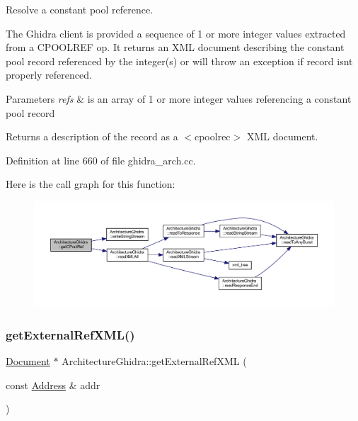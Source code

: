 Resolve a constant pool reference. 

The Ghidra client is provided a sequence of 1 or more integer values extracted from a C\+P\+O\+O\+L\+R\+EF op. It returns an X\+ML document describing the constant pool record referenced by the integer(s) or will throw an exception if record isn\textquotesingle{}t properly referenced. 
\begin{DoxyParams}{Parameters}
{\em refs} & is an array of 1 or more integer values referencing a constant pool record \\
\hline
\end{DoxyParams}
\begin{DoxyReturn}{Returns}
a description of the record as a $<$cpoolrec$>$ X\+ML document. 
\end{DoxyReturn}


Definition at line 660 of file ghidra\+\_\+arch.\+cc.

Here is the call graph for this function\+:
\nopagebreak
\begin{figure}[H]
\begin{center}
\leavevmode
\includegraphics[width=350pt]{class_architecture_ghidra_a3806ce145501bdeb8dc6d60bad920d24_cgraph}
\end{center}
\end{figure}
\mbox{\label{class_architecture_ghidra_ab3f7d8642e6d84aa7ee3806620ef34ff}} 
\subsubsection{\texorpdfstring{getExternalRefXML()}{getExternalRefXML()}}
{\footnotesize\ttfamily \mbox{\hyperlink{class_document}{Document}} $\ast$ Architecture\+Ghidra\+::get\+External\+Ref\+X\+ML (\begin{DoxyParamCaption}\item[{const \mbox{\hyperlink{class_address}{Address}} \&}]{addr }\end{DoxyParamCaption})}



